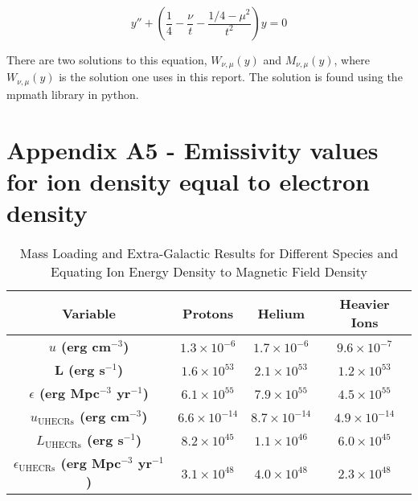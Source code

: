 \begin{equation}
    y'' + \left( \frac{1}{4} - \frac{\nu}{t} - \frac{1/4-\mu^2}{t^2} \right) y = 0
\end{equation}

There are two solutions to this equation, $W_{\nu,\mu}(y)$ and $M_{\nu,\mu}(y)$, where $W_{\nu,\mu}(y)$ is the solution one uses in this report. The solution is found using the mpmath library in python. 

\section*{Appendix A5 - Emissivity values for ion density equal to electron density}
\begin{table}[h!]
    \centering
    \begin{tabular}{|c|c|c|c|}
    \hline
    \textbf{Variable} & \textbf{Protons} & \textbf{Helium} & \textbf{Heavier Ions} \\
    \hline
    \textbf{$u$ (erg cm$^{-3}$)} & \(1.3 \times 10^{-6}\) & \(1.7 \times 10^{-6}\) & \(9.6 \times 10^{-7}\) \\
    \hline
    \textbf{L (erg s$^{-1}$)} & \(1.6 \times 10^{53}\) & \(2.1 \times 10^{53}\) & \(1.2 \times 10^{53}\) \\
    \hline
    \textbf{$\epsilon$ (erg Mpc$^{-3}$ yr$^{-1}$)} & \(6.1 \times 10^{55}\) & \(7.9 \times 10^{55}\) & \(4.5 \times 10^{55}\) \\
    \hline
    \textbf{$u_{\text{UHECRs}}$ (erg cm$^{-3}$)} & \(6.6 \times 10^{-14}\) & \(8.7 \times 10^{-14}\) & \(4.9 \times 10^{-14}\) \\
    \hline
    \textbf{$L_{\text{UHECRs}}$ (erg s$^{-1}$)} & \(8.2 \times 10^{45}\) & \(1.1 \times 10^{46}\) & \(6.0 \times 10^{45}\) \\
    \hline
    \textbf{$\epsilon_{\text{UHECRs}}$  (erg Mpc$^{-3}$ yr$^{-1}$)} & \(3.1 \times 10^{48}\) & \(4.0 \times 10^{48}\) & \(2.3 \times 10^{48}\) \\
    \hline
    \end{tabular}
    \caption{Mass Loading and Extra-Galactic Results for Different Species and Equating Ion Energy Density to Magnetic Field Density}
    \label{tab:emissivity_mass_load_B}
\end{table}